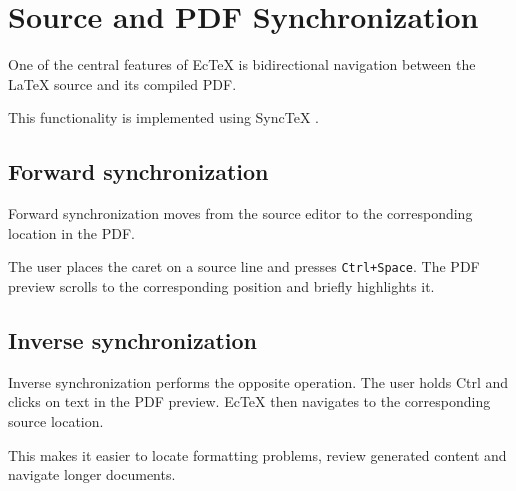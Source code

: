\section{Source and PDF Synchronization}

One of the central features of EcTeX is bidirectional
navigation between the LaTeX source and its compiled PDF.

This functionality is implemented using SyncTeX
\cite{synctex}.

\subsection{Forward synchronization}

Forward synchronization moves from the source editor
to the corresponding location in the PDF.

The user places the caret on a source line and presses
\texttt{Ctrl+Space}. The PDF preview scrolls to the
corresponding position and briefly highlights it.

\subsection{Inverse synchronization}

Inverse synchronization performs the opposite operation.
The user holds Ctrl and clicks on text in the PDF preview.
EcTeX then navigates to the corresponding source location.

This makes it easier to locate formatting problems,
review generated content and navigate longer documents.
